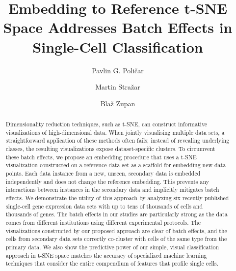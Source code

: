 \documentclass[runningheads]{llncs}
\begin{document}
%
\title{Embedding to Reference t-SNE Space Addresses Batch Effects in Single-Cell Classification}
%
%
\author{Pavlin G. Poli\v{c}ar \and
Martin Stra\v{z}ar \and
Bla\v{z} Zupan}
%
%

\maketitle

\begin{abstract}

Dimensionality reduction techniques, such as t-SNE, can construct informative
visualizations of high-dimensional data. When jointly visualising multiple data
sets, a straightforward application of these methods often fails; instead of
revealing underlying classes, the resulting visualizations expose
dataset-specific clusters. To circumvent these batch effects, we propose an
embedding procedure that uses a t-SNE visualization constructed on a reference
data set as a scaffold for embedding new data points. Each data instance from a
new, unseen, secondary data is embedded independently and does not change the
reference embedding. This prevents any interactions between instances in the
secondary data and implicitly mitigates batch effects. We demonstrate the
utility of this approach by analyzing six recently published single-cell gene
expression data sets with up to tens of thousands of cells and thousands of
genes. The batch effects in our studies are particularly strong as the data
comes from different institutions using different experimental protocols. The
visualizations constructed by our proposed approach are clear of batch effects,
and the cells from secondary data sets correctly co-cluster with cells of the
same type from the primary data. We also show the predictive power of our
simple, visual classification approach in t-SNE space matches the accuracy of
specialized machine learning techniques that consider the entire compendium of
features that profile single cells.

\end{abstract}
\end{document}
